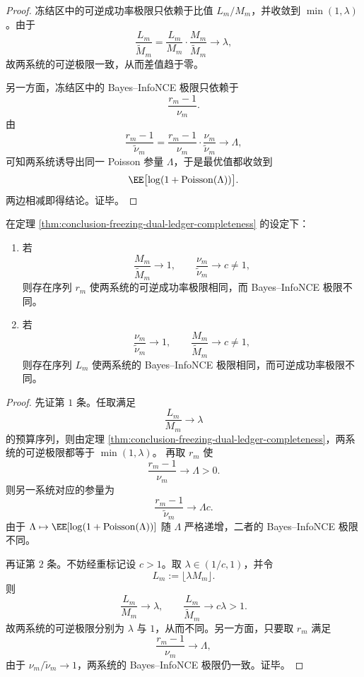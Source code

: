 \begin{proof}
冻结区中的可逆成功率极限只依赖于比值 \(L_m/M_m\)，并收敛到 \(\min(1,\lambda)\)。由于
\[
\frac{L_m}{\widetilde M_m}
=
\frac{L_m}{M_m}\cdot \frac{M_m}{\widetilde M_m}
\longrightarrow \lambda,
\]
故两系统的可逆极限一致，从而差值趋于零。

另一方面，冻结区中的 Bayes--InfoNCE 极限只依赖于
\[
\frac{r_m-1}{\nu_m}.
\]
由
\[
\frac{r_m-1}{\widetilde \nu_m}
=
\frac{r_m-1}{\nu_m}\cdot \frac{\nu_m}{\widetilde \nu_m}
\longrightarrow \Lambda,
\]
可知两系统诱导出同一 Poisson 参量 \(\Lambda\)，于是最优值都收敛到
\[
\EE\bigl[\log(1+\mathrm{Poisson}(\Lambda))\bigr].
\]
两边相减即得结论。证毕。
\end{proof}

\begin{corollary}[尺度账本与简并账本的正交不可替代性]\label{cor:conclusion-scale-ledger-degeneracy-ledger-orthogonality}
在定理 \ref{thm:conclusion-freezing-dual-ledger-completeness} 的设定下：
\begin{enumerate}
  \item 若
  \[
  \frac{M_m}{\widetilde M_m}\to 1,
  \qquad
  \frac{\nu_m}{\widetilde \nu_m}\to c\neq 1,
  \]
  则存在序列 \(r_m\) 使两系统的可逆成功率极限相同，而 Bayes--InfoNCE 极限不同。
  \item 若
  \[
  \frac{\nu_m}{\widetilde \nu_m}\to 1,
  \qquad
  \frac{M_m}{\widetilde M_m}\to c\neq 1,
  \]
  则存在序列 \(L_m\) 使两系统的 Bayes--InfoNCE 极限相同，而可逆成功率极限不同。
\end{enumerate}
\end{corollary}

\begin{proof}
先证第 \(1\) 条。任取满足
\[
\frac{L_m}{M_m}\to \lambda
\]
的预算序列，则由定理 \ref{thm:conclusion-freezing-dual-ledger-completeness}，两系统的可逆极限都等于 \(\min(1,\lambda)\)。
再取 \(r_m\) 使
\[
\frac{r_m-1}{\nu_m}\to \Lambda>0.
\]
则另一系统对应的参量为
\[
\frac{r_m-1}{\widetilde \nu_m}\to \Lambda c.
\]
由于 \(\Lambda\mapsto \EE[\log(1+\mathrm{Poisson}(\Lambda))]\) 随 \(\Lambda\) 严格递增，二者的 Bayes--InfoNCE 极限不同。

再证第 \(2\) 条。不妨经重标记设 \(c>1\)。取 \(\lambda\in(1/c,1)\)，并令
\[
L_m:=\lfloor \lambda M_m\rfloor.
\]
则
\[
\frac{L_m}{M_m}\to \lambda,
\qquad
\frac{L_m}{\widetilde M_m}\to c\lambda>1.
\]
故两系统的可逆极限分别为 \(\lambda\) 与 \(1\)，从而不同。另一方面，只要取 \(r_m\) 满足
\[
\frac{r_m-1}{\nu_m}\to \Lambda,
\]
由于 \(\nu_m/\widetilde \nu_m\to 1\)，两系统的 Bayes--InfoNCE 极限仍一致。证毕。
\end{proof}

